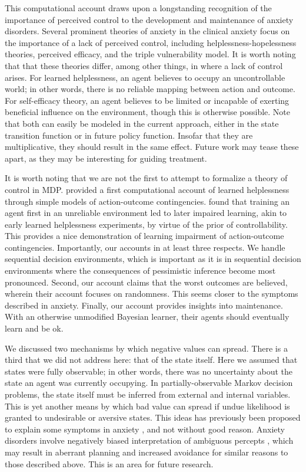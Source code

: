\documentclass[11pt]{article} %
\begin{document}
This computational account draws upon a longstanding recognition of the importance of perceived control to the development and maintenance of anxiety disorders. Several prominent theories of anxiety in the clinical anxiety focus on the importance of a lack of perceived control, including helplessness-hopelessness theories, perceived efficacy, and the triple vulnerability model. It is worth noting that that these theories differ, among other things, in where a lack of control arises. For learned helplessness, an agent believes to occupy an uncontrollable world; in other words, there is no reliable mapping between action and outcome. For self-efficacy theory, an agent believes to be limited or incapable of exerting beneficial influence on the environment, though this is otherwise possible. Note that both can easily be modeled in the current approach, either in the state transition function or in future policy function. Insofar that they are multiplicative, they should result in the same effect. Future work may tease these apart, as they may be interesting for guiding treatment.

It is worth noting that we are not the first to attempt to formalize a theory of control in MDP. \cite{HuysDayan2009} provided a first computational account of learned helplessness through simple models of action-outcome contingencies. \cite{HuysDayan2009} found that training an agent first in an unreliable environment led to later impaired learning, akin to early learned helplessness experiments, by virtue of the prior of controllability. This provides a nice demonstration of learning impairment of action-outcome contingencies. Importantly, our accounts in at least three respects. We handle sequential decision environments, which is important as it is in sequential decision environments where the consequences of pessimistic inference become most pronounced. Second, our account claims that the worst outcomes are believed, wherein their account focuses on randomness. This seems closer to the symptoms described in anxiety. Finally, our account provides insights into maintenance. With an otherwise unmodified Bayesian learner, their agents should eventually learn and be ok.

We discussed two mechanisms by which negative values can spread. There is a third that we did not address here: that of the state itself. Here we assumed that states were fully observable; in other words, there was no uncertainty about the state an agent was currently occupying. In partially-observable Markov decision problems, the state itself must be inferred from external and internal variables. This is yet another means by which bad value can spread if undue likelihood is granted to undesirable or aversive states. This ideas has previously been proposed to explain some symptoms in anxiety \citep{Paulus2012}, and not without good reason. Anxiety disorders involve negatively biased interpretation of ambiguous percepts \citep{Hartley2012}, which may result in aberrant planning and increased avoidance for similar reasons to those described above. This is an area for future research.
\end{document}
